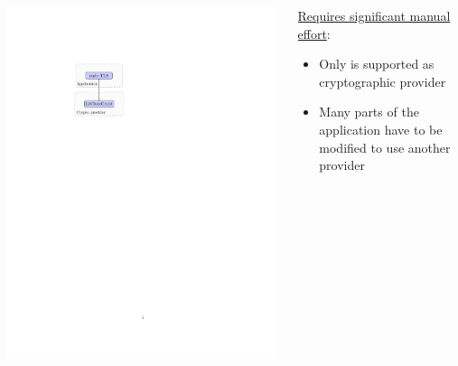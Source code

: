 \begin{frame}

\begin{columns}[t]

\begin{column}{0.375\textwidth}

\vspace{1cm}

\includegraphics[trim=5cm 5cm 14cm 4.25cm]{figures/intro_cw.pdf}

\end{column}

\begin{column}{0.625\textwidth}

\vspace{1.75cm}

\underline{Requires significant manual effort}:
\begin{itemize}
  \item Only \tomcrypt is supported as cryptographic provider
  \item Many parts of the application have to be modified to use another
  provider
\end{itemize}

\end{column}

\end{columns}

\end{frame}


